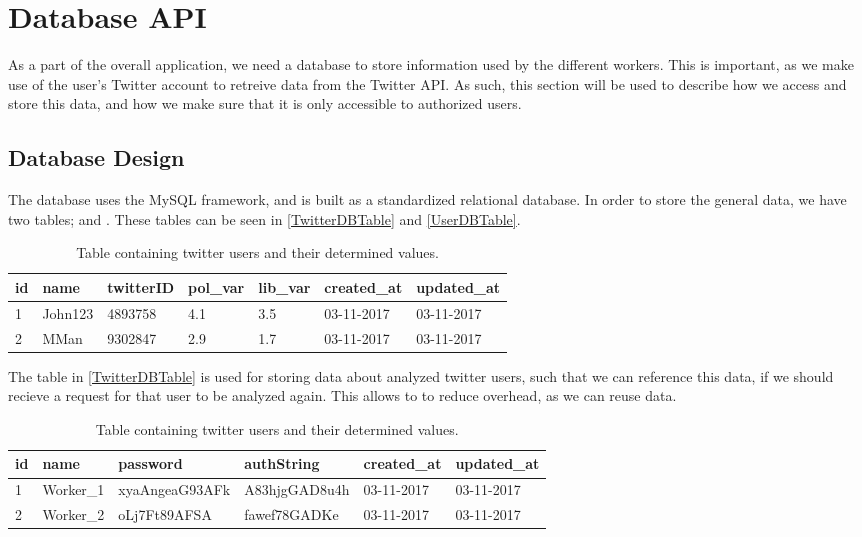 \chapter{Database API}
As a part of the overall application, we need a database to store information
used by the different workers. This is important, as we make use of the
user's Twitter account to retreive data from the Twitter API. As such, this
section will be used to describe how we access and store this data, and how we
make sure that it is only accessible to authorized users.

\section{Database Design}\label{DBDesign}
The database uses the MySQL framework, and is built as a standardized relational
database. In order to store the general data, we have two tables; 
and . These tables can be seen in \autoref{TwitterDBTable}
and \autoref{UserDBTable}.

\begin{table}[H]
\begin{tabular}{l | l | l | l | l | l | l}
\textbf{id} & \textbf{name} & \textbf{twitterID} & \textbf{pol\_var} & \textbf{lib\_var} & \textbf{created\_at} & \textbf{updated\_at}\\\hline
1 & John123 & 4893758 & 4.1 & 3.5 & 03-11-2017 & 03-11-2017 \\\hline
2 & MMan & 9302847 & 2.9 & 1.7 & 03-11-2017 & 03-11-2017 \\\hline
\end{tabular}
\caption{Table containing twitter users and their determined values.}
\label{TwitterDBTable}
\end{table}

The table in \autoref{TwitterDBTable} is used for storing data about analyzed
twitter users, such that we can reference this data, if we should recieve
a request for that user to be analyzed again. This allows to to reduce overhead,
as we can reuse data.

\begin{table}[H]
\begin{tabular}{l | l | l | l | l | l}
\textbf{id} & \textbf{name} & \textbf{password} & \textbf{authString} &
\textbf{created\_at} & \textbf{updated\_at}\\\hline
1 & Worker\_1 & xyaAngeaG93AFk & A83hjgGAD8u4h & 03-11-2017 & 03-11-2017
\\\hline
2 & Worker\_2 & oLj7Ft89AFSA & fawef78GADKe & 03-11-2017 & 03-11-2017 \\\hline
\end{tabular}
\caption{Table containing twitter users and their determined values.}
\label{UserDBTable}
\end{table}

